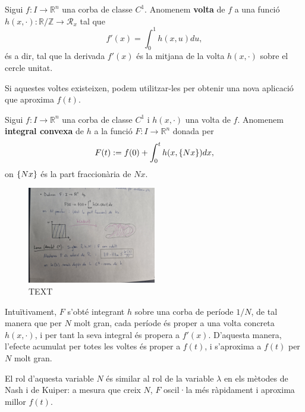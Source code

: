 \begin{defi}
    Sigui $f:I\to\mathbb R^n$ una corba de classe $C^1$. Anomenem \textbf{volta} de $f$ a una funció $h(x, \cdot): \mathbb R / \mathbb Z \to \mathcal R_x$ tal que
    \begin{equation}\label{eq:def voltes}
        f'(x) = \int_0^1 h(x, u)  du,
    \end{equation}
    és a dir, tal que la derivada $f'(x)$ és la mitjana de la volta $h(x, \cdot)$ sobre el cercle unitat.
\end{defi}

Si aquestes voltes existeixen, podem utilitzar-les per obtenir una nova aplicació que aproxima $f(t)$.
\begin{defi}
    Sigui $f:I\to\mathbb R^n$ una corba de classe $C^1$ i $h(x, \cdot)$ una volta de $f$. Anomenem \textbf{integral convexa} de $h$ a la funció $F:I\to\mathbb R^n$ donada per
    \begin{equation*}
        F(t) := f(0) + \int_0^t h(x, \{Nx\})  dx,
    \end{equation*}
    on $\{Nx\}$ és la part fraccionària de $Nx$.
\end{defi}    

\begin{figure}[htbp]
    \centering
    \includegraphics[width=0.5\textwidth]{Fotos/CINQUENA.jpg}
    \caption{{\color{blue}TEXT}}
    \label{fig:cinquena_foto}
\end{figure}

Intuïtivament, $F$ s'obté integrant $h$ sobre una corba de període $1/N$, de tal manera que per $N$ molt gran, cada període és proper a una volta concreta $h(x, \cdot)$, i per tant la seva integral és propera a $f'(x)$. D'aquesta manera, l'efecte acumulat per totes les voltes és proper a $f(t)$, i s'aproxima a $f(t)$ per $N$ molt gran. 
\begin{obs}
    El rol d'aquesta variable $N$ és similar al rol de la variable $\lambda$ en els mètodes de Nash i de Kuiper: a mesura que creix $N$, $F$ oscil·la més ràpidament i aproxima millor $f(t)$.
\end{obs}

